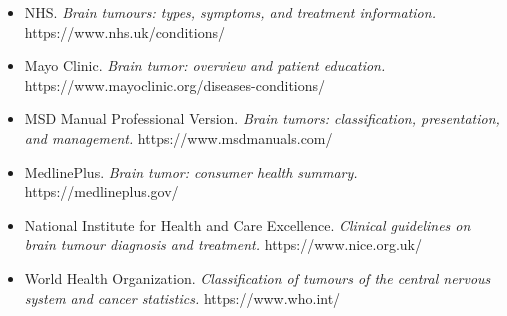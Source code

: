 \begin{itemize}
    \item NHS. \textit{Brain tumours: types, symptoms, and treatment information.} https://www.nhs.uk/conditions/
    \item Mayo Clinic. \textit{Brain tumor: overview and patient education.} https://www.mayoclinic.org/diseases-conditions/
    \item MSD Manual Professional Version. \textit{Brain tumors: classification, presentation, and management.} https://www.msdmanuals.com/
    \item MedlinePlus. \textit{Brain tumor: consumer health summary.} https://medlineplus.gov/
    \item National Institute for Health and Care Excellence. \textit{Clinical guidelines on brain tumour diagnosis and treatment.} https://www.nice.org.uk/
    \item World Health Organization. \textit{Classification of tumours of the central nervous system and cancer statistics.} https://www.who.int/
\end{itemize}

